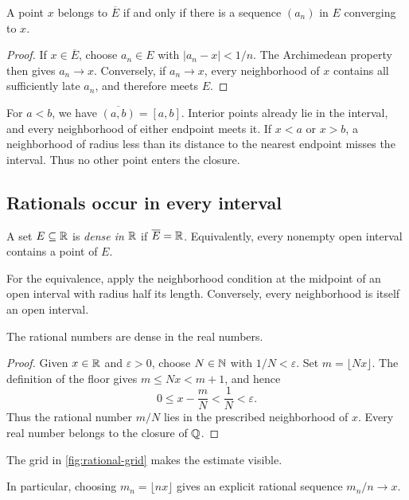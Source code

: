 \begin{proposition}
  A point $x$ belongs to $\overline E$ if and only if there is a sequence
  $(a_n)$ in $E$ converging to $x$.
\end{proposition}
\begin{proof}
  If $x\in\overline E$, choose $a_n\in E$ with $|a_n-x|<1/n$.
  The Archimedean property then gives $a_n\to x$. Conversely, if
  $a_n\to x$, every neighborhood of $x$ contains all sufficiently late
  $a_n$, and therefore meets $E$.
\end{proof}
For $a<b$, we have $\overline{(a,b)}=[a,b]$. Interior points already lie
in the interval, and every neighborhood of either endpoint meets it.
If $x<a$ or $x>b$, a neighborhood of radius less than its distance to the
nearest endpoint misses the interval. Thus no other point enters the closure.

\subsection{Rationals occur in every interval}
\begin{definition}
  A set $E\subseteq\mathbb{R}$ is \emph{dense in $\mathbb{R}$} if $\overline E=\mathbb{R}$.
  Equivalently, every nonempty open interval contains a point of $E$.
\end{definition}
For the equivalence, apply the neighborhood condition at the midpoint of
an open interval with radius half its length. Conversely,
every neighborhood is itself an open interval.

\begin{theorem}
  \label{thm:analysis-i:rational-density}
  The rational numbers are dense in the real numbers.
\end{theorem}
\begin{proof}
  Given $x\in\mathbb{R}$ and $\varepsilon>0$, choose $N\in\mathbb{N}$ with
  $1/N<\varepsilon$. Set $m=\lfloor Nx\rfloor$. The definition of the
  floor gives $m\leq Nx<m+1$, and hence
  \[
    0\leq x-\frac{m}{N}<\frac{1}{N}<\varepsilon.
  \]
  Thus the rational number $m/N$ lies in the prescribed neighborhood
  of $x$. Every real number belongs to the closure of $\mathbb{Q}$.
\end{proof}
The grid in \autoref{fig:rational-grid} makes the estimate visible.
\begin{marginfigure}
  \centering
  
  \caption[Approximating a real number on a rational grid.]{Schematic rational grid with spacing $1/N$. The floor chooses
    the left endpoint of the cell containing $x$.}
  \label{fig:rational-grid}
\end{marginfigure}
In particular, choosing $m_n=\lfloor nx\rfloor$ gives an explicit rational
sequence $m_n/n\to x$.



